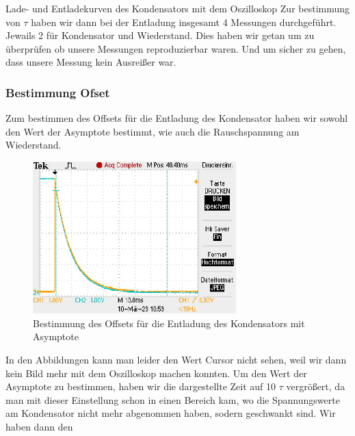 \documentclass[twoside]{protokoll}
\begin{document}
\begin{aufgabe}{Lade- und Entladekurven des Kondensators mit dem Oszilloskop}
Zur bestimmung von $\tau$ haben wir dann bei der Entladung insgesamt 4 Messungen durchgeführt. 
Jewails 2 für Kondensator und Wiederstand. Dies haben wir getan um zu überprüfen ob unsere Messungen reproduzierbar waren. 
Und um sicher zu gehen, dass unsere Messung kein Ausreißer war. 

\subsubsection{Bestimmung Ofset}

Zum bestimmen des Offsets für die Entladung des Kondensator haben wir sowohl den Wert der Asymptote bestimmt, wie auch die Rauschspannung am Wiederstand.
\begin{figure}[H]
  \centering
    \includegraphics[width=0.7\textwidth]{Bilder_Osziloskop/Entladen_Kondensator_Offset.pdf}
    \caption{Bestimmung des Offsets für die Entladung des Kondensators mit Asymptote}
  \centering
\end{figure}
In den Abbildungen kann man leider den Wert Cursor nicht sehen, weil wir dann kein Bild mehr mit dem Oszilloskop machen konnten.
Um den Wert der Asymptote zu bestimmen, haben wir die dargestellte Zeit auf 10 $\tau$ vergrößert, da man mit dieser Einstellung schon in einen Bereich kam, wo die Spannungswerte am Kondensator nicht mehr abgenommen haben, sodern geschwankt sind.
Wir haben dann den 
 

\end{aufgabe}
\end{document}
